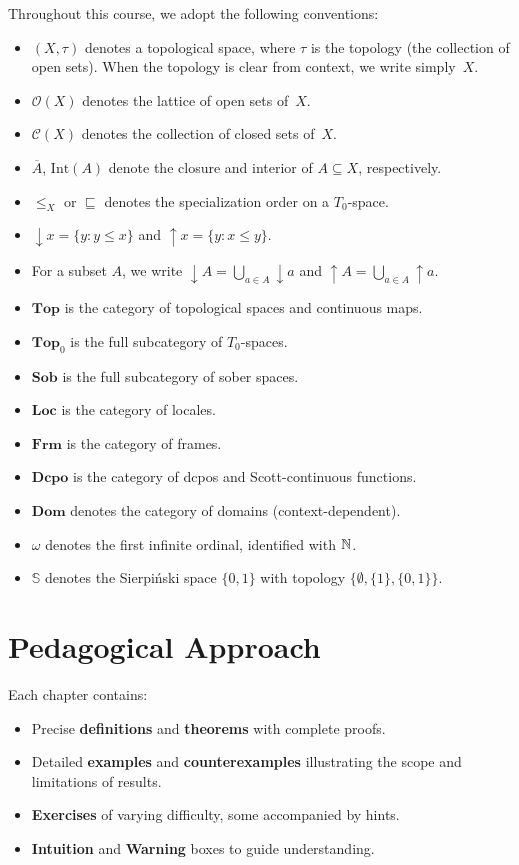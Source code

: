Throughout this course, we adopt the following conventions:
\begin{itemize}
  \item $(X,\tau)$ denotes a topological space, where $\tau$ is the topology (the collection
    of open sets). When the topology is clear from context, we write simply~$X$.
  \item $\mathcal{O}(X)$ denotes the lattice of open sets of~$X$.
  \item $\mathcal{C}(X)$ denotes the collection of closed sets of~$X$.
  \item $\overline{A}$, $\mathrm{Int}(A)$ denote the closure and interior of
    $A \subseteq X$, respectively.
  \item $\leq_X$ or $\sqsubseteq$ denotes the specialization order on a $T_0$-space.
  \item $\downarrow\! x = \{y : y \leq x\}$ and $\uparrow\! x = \{y : x \leq y\}$.
  \item For a subset $A$, we write $\downarrow\! A = \bigcup_{a\in A}\downarrow\! a$
    and $\uparrow\! A = \bigcup_{a\in A}\uparrow\! a$.
  \item $\mathbf{Top}$ is the category of topological spaces and continuous maps.
  \item $\mathbf{Top}_0$ is the full subcategory of $T_0$-spaces.
  \item $\mathbf{Sob}$ is the full subcategory of sober spaces.
  \item $\mathbf{Loc}$ is the category of locales.
  \item $\mathbf{Frm}$ is the category of frames.
  \item $\mathbf{Dcpo}$ is the category of dcpos and Scott-continuous functions.
  \item $\mathbf{Dom}$ denotes the category of domains (context-dependent).
  \item $\omega$ denotes the first infinite ordinal, identified with $\mathbb{N}$.
  \item $\mathbb{S}$ denotes the Sierpi\'nski space $\{0,1\}$ with topology
    $\{\emptyset, \{1\}, \{0,1\}\}$.
\end{itemize}

\section*{Pedagogical Approach}

Each chapter contains:
\begin{itemize}
  \item Precise \textbf{definitions} and \textbf{theorems} with complete proofs.
  \item Detailed \textbf{examples} and \textbf{counterexamples} illustrating the scope and
    limitations of results.
  \item \textbf{Exercises} of varying difficulty, some accompanied by hints.
  \item \textbf{Intuition} and \textbf{Warning} boxes to guide understanding.
\end{itemize}

